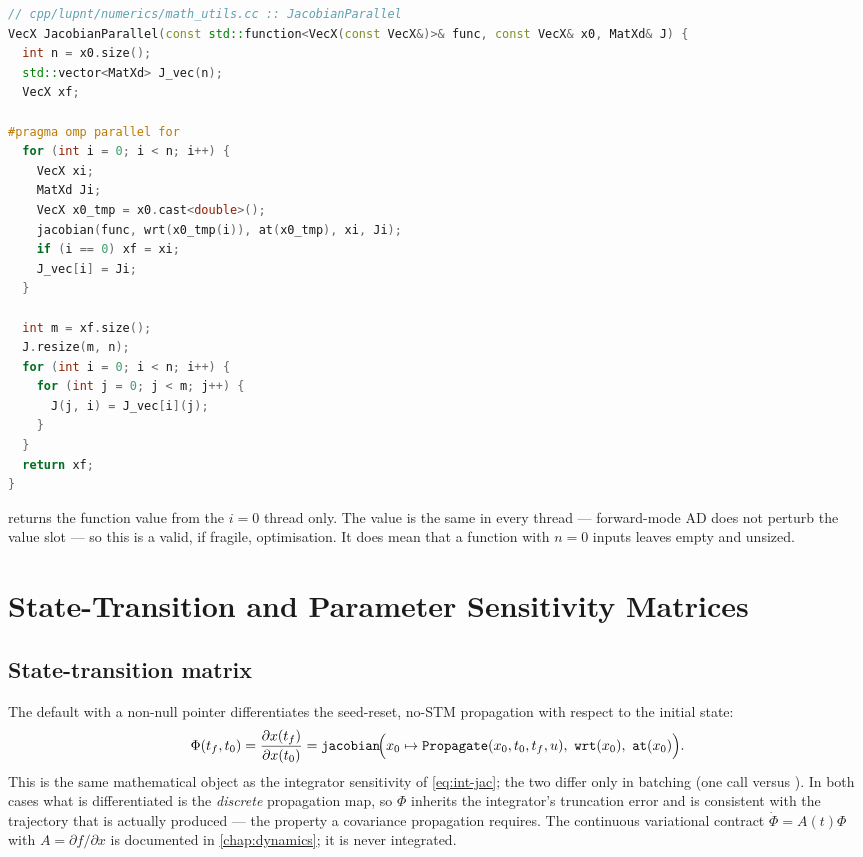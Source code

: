 \begin{lstlisting}[language=cpp, caption={Column-parallel Jacobian. Source: \code{cpp/lupnt/numerics/math\_utils.cc}}, label={lst:ad-jacpar}]
// cpp/lupnt/numerics/math_utils.cc :: JacobianParallel
VecX JacobianParallel(const std::function<VecX(const VecX&)>& func, const VecX& x0, MatXd& J) {
  int n = x0.size();
  std::vector<MatXd> J_vec(n);
  VecX xf;

#pragma omp parallel for
  for (int i = 0; i < n; i++) {
    VecX xi;
    MatXd Ji;
    VecX x0_tmp = x0.cast<double>();
    jacobian(func, wrt(x0_tmp(i)), at(x0_tmp), xi, Ji);
    if (i == 0) xf = xi;
    J_vec[i] = Ji;
  }

  int m = xf.size();
  J.resize(m, n);
  for (int i = 0; i < n; i++) {
    for (int j = 0; j < m; j++) {
      J(j, i) = J_vec[i](j);
    }
  }
  return xf;
}
\end{lstlisting}

\begin{lupntnote}
   returns the function value from the $i=0$ thread
  only. The value is the same in every thread --- forward-mode AD does not
  perturb the value slot --- so this is a valid, if fragile, optimisation. It
  does mean that a function with $n = 0$ inputs leaves  empty and
   unsized.
\end{lupntnote}

\section{State-Transition and Parameter Sensitivity Matrices}
\label{sec:ad-stm}

\subsection{State-transition matrix}

The default  with a non-null  pointer
differentiates the seed-reset, no-STM propagation with respect to the initial
state:
\begin{equation}
  \label{eq:ad-stm}
  \Phi(t_f, t_0) = \frac{\partial x(t_f)}{\partial x(t_0)}
    = \texttt{jacobian}\!\Big(
        x_0 \mapsto \texttt{Propagate}(x_0, t_0, t_f, u),
        \ \texttt{wrt}(x_0),\ \texttt{at}(x_0)
      \Big).
\end{equation}
This is the same mathematical object as the integrator sensitivity of
\cref{eq:int-jac}; the two differ only in batching (one  call
versus ). In both cases what is differentiated is the
\emph{discrete} propagation map, so $\Phi$ inherits the integrator's
truncation error and is consistent with the trajectory that is actually
produced --- the property a covariance propagation requires. The continuous
variational contract $\dot{\Phi} = A(t)\Phi$ with
$A = \partial f/\partial x$ is documented in \cref{chap:dynamics}; it is never
integrated.

